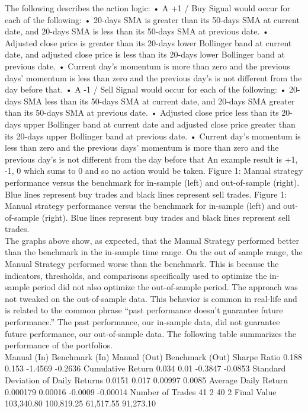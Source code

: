 \documentclass{article}
\begin{document}
The following describes the action logic:
	•	A +1 / Buy Signal would occur for each of the following:
	•	20-days SMA is greater than its 50-days SMA at current date, and 20-days SMA is less than its 50-days SMA at previous date.
	•	Adjusted close price is greater than its 20-days lower Bollinger band at current date, and adjusted close price is less than its 20-days lower Bollinger band at previous date.
	•	Current day’s momentum is more than zero and the previous days’ momentum is less than zero and the previous day’s is not different from the day before that.
	•	A -1 / Sell Signal would occur for each of the following:
	•	20-days SMA less than its 50-days SMA at current date, and 20-days SMA greater than its 50-days SMA at previous date.
	•	Adjusted close price less than its 20-days upper Bollinger band at current date and adjusted close price greater than its 20-days upper Bollinger band at previous date.
	•	Current day’s momentum is less than zero and the previous days’ momentum is more than zero and the previous day’s is not different from the day before that
An example result is +1, -1, 0 which sums to 0 and so no action would be taken.
Figure 1: Manual strategy performance versus the benchmark for in-sample (left) and out-of-sample (right). Blue lines represent buy trades and black lines represent sell trades.
Figure 1: Manual strategy performance versus the benchmark for in-sample (left) and out-of-sample (right). Blue lines represent buy trades and black lines represent sell trades.\\

The graphs above show, as expected, that the Manual Strategy performed better than the benchmark in the in-sample time range. On the out of sample range, the Manual Strategy performed worse than the benchmark. This is because the indicators, thresholds, and comparisons specifically used to optimize the in-sample period did not also optimize the out-of-sample period. The approach was not tweaked on the out-of-sample data. This behavior is common in real-life and is related to the common phrase “past performance doesn’t guarantee future performance.” The past performance, our in-sample data, did not guarantee future performance, our out-of-sample data.
The following table summarizes the performance of the portfolios.\\

Manual (In)
Benchmark (In)
Manual (Out)
Benchmark (Out)
Sharpe Ratio
0.188
0.153
-1.4569
-0.2636
Cumulative Return
0.034
0.01
-0.3847
-0.0853
Standard Deviation of Daily Returns
0.0151
0.017
0.00997
0.0085
Average Daily Return
0.000179
0.00016
-0.0009
-0.00014
Number of Trades
41
2
40
2
Final Value
103,340.80
100,819.25
61,517.55
91,273.10\\
\end{document}
